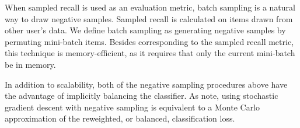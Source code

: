 When sampled recall is used as an evaluation metric, batch sampling is a natural
way to draw negative samples. Sampled recall is calculated on items drawn from
other user's data. We define batch sampling as generating negative samples by
permuting mini-batch items. Besides corresponding to the sampled recall metric,
this technique is memory-efficient, as it requires that only the current
mini-batch be in memory.

In addition to scalability, both of the negative sampling procedures above have
the advantage of implicitly balancing the classifier. As
\citet{veitch2019empirical} note, using stochastic gradient descent with
negative sampling is equivalent to a Monte Carlo approximation of the
reweighted, or balanced, classification loss.

